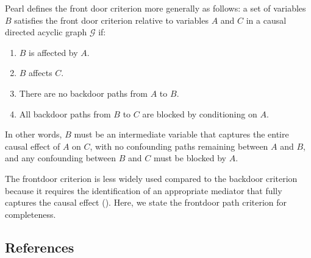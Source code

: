 \documentclass[
  single column]{article}
\providecommand{\tightlist}{%
  \setlength{\itemsep}{0pt}\setlength{\parskip}{0pt}}\usepackage{longtable,booktabs,array}
\begin{document}
Pearl defines the front door criterion more generally as follows: a set
of variables \(B\) satisfies the front door criterion relative to
variables \(A\) and \(C\) in a causal directed acyclic graph
\(\mathcal{G}\) if:

\begin{enumerate}
\def\labelenumi{\arabic{enumi}.}
\tightlist
\item
  \(B\) is affected by \(A\).
\item
  \(B\) affects \(C\).
\item
  There are no backdoor paths from \(A\) to \(B\).
\item
  All backdoor paths from \(B\) to \(C\) are blocked by conditioning on
  \(A\).
\end{enumerate}

In other words, \(B\) must be an intermediate variable that captures the
entire causal effect of \(A\) on \(C\), with no confounding paths
remaining between \(A\) and \(B\), and any confounding between \(B\) and
\(C\) must be blocked by \(A\).

The frontdoor criterion is less widely used compared to the backdoor
criterion because it requires the identification of an appropriate
mediator that fully captures the causal effect
(). Here, we state the frontdoor
path criterion for completeness.

\newpage{}

\subsection{References}\label{references}
\end{document}
